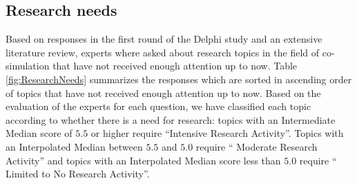 \subsection{Research needs}
Based on responses in the first round of the Delphi study and an extensive literature review, experts where asked about research topics in the field of co-simulation that have not received enough attention up to now.
Table \ref{fig:ResearchNeeds} summarizes the responses which are sorted in ascending order of topics that have not received enough attention up to now. 
Based on the evaluation of the experts for each question, we have classified each topic according to whether there is a need for research: topics with an Intermediate Median score of $5.5$ or higher require ``Intensive Research Activity''.
Topics with an Interpolated Median between $5.5$ and $5.0$ require `` Moderate Research Activity'' and topics with an Interpolated Median score less than $5.0$ require `` Limited to No Research Activity''.


